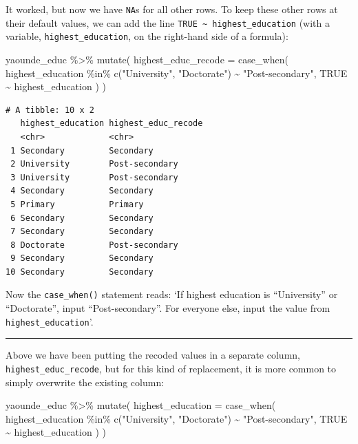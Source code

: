 \documentclass[
  letterpaper,
  DIV=11,
  numbers=noendperiod]{scrreprt}
\newenvironment{Shaded}{\begin{snugshade}}{\end{snugshade}}
\newcommand{\AttributeTok}[1]{\textcolor[rgb]{0.40,0.45,0.13}{#1}}
\newcommand{\ConstantTok}[1]{\textcolor[rgb]{0.56,0.35,0.01}{#1}}
\newcommand{\FunctionTok}[1]{\textcolor[rgb]{0.28,0.35,0.67}{#1}}
\newcommand{\NormalTok}[1]{\textcolor[rgb]{0.00,0.23,0.31}{#1}}
\newcommand{\SpecialCharTok}[1]{\textcolor[rgb]{0.37,0.37,0.37}{#1}}
\newcommand{\StringTok}[1]{\textcolor[rgb]{0.13,0.47,0.30}{#1}}
\begin{document}
It worked, but now we have \texttt{NA}s for all other rows. To keep
these other rows at their default values, we can add the line
\texttt{TRUE\ \textasciitilde{}\ highest\_education} (with a variable,
\texttt{highest\_education}, on the right-hand side of a formula):

\begin{Shaded}
\begin{Highlighting}[]
\NormalTok{yaounde\_educ }\SpecialCharTok{\%\textgreater{}\%}
  \FunctionTok{mutate}\NormalTok{(}
    \AttributeTok{highest\_educ\_recode =}
      \FunctionTok{case\_when}\NormalTok{(}
\NormalTok{        highest\_education }\SpecialCharTok{\%in\%} \FunctionTok{c}\NormalTok{(}\StringTok{"University"}\NormalTok{, }\StringTok{"Doctorate"}\NormalTok{) }\SpecialCharTok{\textasciitilde{}} \StringTok{"Post{-}secondary"}\NormalTok{,}
        \ConstantTok{TRUE} \SpecialCharTok{\textasciitilde{}}\NormalTok{ highest\_education}
\NormalTok{      )}
\NormalTok{  )}
\end{Highlighting}
\end{Shaded}

\begin{verbatim}
# A tibble: 10 x 2
   highest_education highest_educ_recode
   <chr>             <chr>              
 1 Secondary         Secondary          
 2 University        Post-secondary     
 3 University        Post-secondary     
 4 Secondary         Secondary          
 5 Primary           Primary            
 6 Secondary         Secondary          
 7 Secondary         Secondary          
 8 Doctorate         Post-secondary     
 9 Secondary         Secondary          
10 Secondary         Secondary          
\end{verbatim}

Now the \texttt{case\_when()} statement reads: `If highest education is
``University'' or ``Doctorate'', input ``Post-secondary''. For everyone
else, input the value from \texttt{highest\_education}'.

\begin{center}\rule{0.5\linewidth}{0.5pt}\end{center}

Above we have been putting the recoded values in a separate column,
\texttt{highest\_educ\_recode}, but for this kind of replacement, it is
more common to simply overwrite the existing column:

\begin{Shaded}
\begin{Highlighting}[]
\NormalTok{yaounde\_educ }\SpecialCharTok{\%\textgreater{}\%}
  \FunctionTok{mutate}\NormalTok{(}
    \AttributeTok{highest\_education =}
      \FunctionTok{case\_when}\NormalTok{(}
\NormalTok{        highest\_education }\SpecialCharTok{\%in\%} \FunctionTok{c}\NormalTok{(}\StringTok{"University"}\NormalTok{, }\StringTok{"Doctorate"}\NormalTok{) }\SpecialCharTok{\textasciitilde{}} \StringTok{"Post{-}secondary"}\NormalTok{,}
        \ConstantTok{TRUE} \SpecialCharTok{\textasciitilde{}}\NormalTok{ highest\_education}
\NormalTok{      )}
\NormalTok{  )}
\end{Highlighting}
\end{Shaded}
\end{document}
